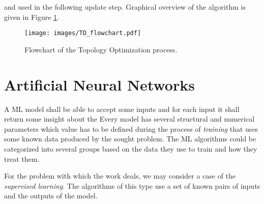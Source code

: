 and used in the following update step.
Graphical overview of the algorithm is given in Figure \ref{fig:to_flow}.

\begin{figure}[ht]
	\centering
	\texttt{[image: images/TO\_flowchart.pdf]}
	\caption{Flowchart of the Topology Optimization process.}
	\label{fig:to_flow}
\end{figure}



\chapter{Artificial Neural Networks}



A ML model shall be able to accept some inputs and for each input it shall return some insight about the 
Every model has several structural and numerical parameters which value has to be defined during the process of \emph{training} that uses some known data produced by the sought problem.
The ML algorithms could be categorized into several groups based on the data they use to train and how they treat them.

For the problem with which the work deals, we may consider a case of the \emph{supervised learning}.
The algorithms of this type use a set of known pairs of inputs and the outputs of the model.


